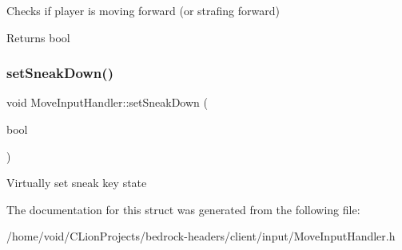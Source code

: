 Checks if player is moving forward (or strafing forward) \begin{DoxyReturn}{Returns}
bool 
\end{DoxyReturn}
\mbox{\label{struct_move_input_handler_a407a746a068a08e0e13942256ac28332}} 
\subsubsection{\texorpdfstring{setSneakDown()}{setSneakDown()}}
{\footnotesize\ttfamily void Move\+Input\+Handler\+::set\+Sneak\+Down (\begin{DoxyParamCaption}\item[{bool}]{ }\end{DoxyParamCaption})}

Virtually set sneak key state 

The documentation for this struct was generated from the following file\+:\begin{DoxyCompactItemize}
\item 
/home/void/\+C\+Lion\+Projects/bedrock-\/headers/client/input/Move\+Input\+Handler.\+h\end{DoxyCompactItemize}
